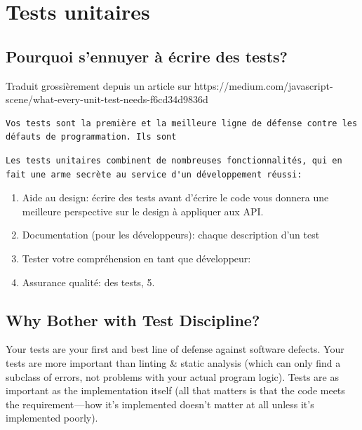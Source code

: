 \documentclass[11pt]{amsbook}
\begin{document}
\hypertarget{x-tests-unitaires}{\chapter{Tests unitaires}}
\hypertarget{x-pourquoi-s’ennuyer-à-écrire-des-tests?}{\section{Pourquoi s’ennuyer à écrire des tests?}}
Traduit grossièrement depuis un article sur https://medium.com/javascript-scene/what-every-unit-test-needs-f6cd34d9836d

\begin{verbatim}
Vos tests sont la première et la meilleure ligne de défense contre les défauts de programmation. Ils sont
\end{verbatim}

\begin{verbatim}
Les tests unitaires combinent de nombreuses fonctionnalités, qui en fait une arme secrète au service d'un développement réussi:
\end{verbatim}

\begin{enumerate}

\item{Aide au design: écrire des tests avant d’écrire le code vous donnera une meilleure perspective sur le design à appliquer aux API.}

\item{Documentation (pour les développeurs): chaque description d’un test}

\item{Tester votre compréhension en tant que développeur:}

\item{Assurance qualité: des tests,
5.}

\end{enumerate}


\hypertarget{x-why-bother-with-test-discipline?}{\section{Why Bother with Test Discipline?}}
Your tests are your first and best line of defense against software defects. Your tests are more important than linting \& static analysis (which can only find a subclass of errors, not problems with your actual program logic). Tests are as important as the implementation itself (all that matters is that the code meets the requirement — how it’s implemented doesn’t matter at all unless it’s implemented poorly).
\end{document}

